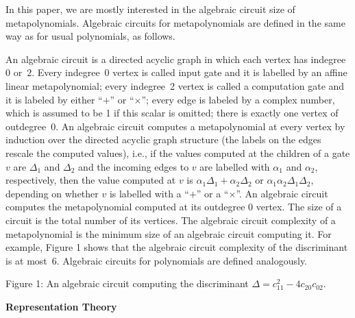 \documentclass[10pt,a4paper]{article}
\begin{document}
In this paper, we are mostly interested in the algebraic circuit size of metapolynomials. Algebraic circuits for metapolynomials are defined in the same way as for usual polynomials, as follows.





An algebraic circuit is a directed acyclic graph in which each vertex
has indegree $0$ or $2$. Every indegree 0 vertex is called input gate and it is labelled by an affine linear metapolynomial; every indegree 2 vertex is called a computation gate and it is labeled by either “$+$” or “$\times$”; every edge is labeled by a complex number, which is assumed to be 1 if this scalar is omitted; there is exactly one vertex of outdegree 0. An algebraic circuit computes a metapolynomial at every vertex by induction over the directed acyclic graph structure (the labels on the edges rescale the computed values), i.e.,
if the values computed at the children of a gate $v$ are $\Delta_{1}$ and $\Delta_{2}$ and the incoming edges to $v$ are labelled with $\alpha_{1}$ and $\alpha_{2}$, respectively, then the value computed at $v$ is $\alpha_{1}\Delta_{1}+\alpha_{2}\Delta_{2}$ or $\alpha_{1}\alpha_{2}\Delta_{1}\Delta_{2}$, depending on whether $v$ is labelled with a “$+$” or a “$\times$”.
An algebraic circuit computes the metapolynomial computed at its outdegree 0 vertex.
The size of a circuit is the total number of its vertices. The algebraic circuit complexity of a metapolynomial is the minimum size of an algebraic circuit computing it.
For example, Figure 1 shows that the algebraic circuit complexity of the discriminant is at most 6. Algebraic circuits for polynomials are defined analogously.




Figure 1: An algebraic circuit computing the discriminant $\Delta=c_{11}^{2}-4c_{20}c_{02}$.




\par\medskip\noindent\textbf{Representation Theory}\par
\end{document}
